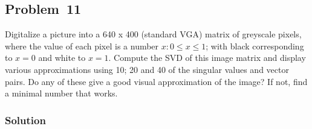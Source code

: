 \subsection{Problem~11}%
\label{problem:11}

Digitalize a picture into a 640 x 400 (standard VGA) matrix of greyscale pixels, where the value of each pixel is a number $x: 0\leq{}x\leq1$; with black corresponding to $x=0$ and white to $x=1$.
Compute the SVD of this image matrix and display various approximations using 10; 20 and 40 of the singular values and vector pairs.
Do any of these give a good visual approximation of the image?
If not, find a minimal number that works.


\subsubsection*{Solution}

